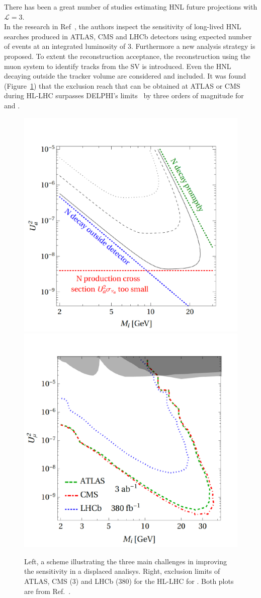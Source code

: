 There has been a great number of studies estimating HNL future
projections with $\mathcal{L} = 3$\abinv.\\
In the research in Ref~\cite{Drewes_2020_jan}, the authors inspect the
sensitivity of long-lived HNL searches produced in ATLAS, CMS and LHCb
detectors using expected number of events at an integrated luminosity
of 3\abinv. Furthermore a new analysis strategy is proposed. To extent
the reconstruction acceptance, the reconstruction using the muon system to identify tracks from the
SV is introduced. Even the HNL decaying outside the tracker
volume are considered and included. It was found
(Figure~\ref{fig:marco_sketch_ll}) that the exclusion
reach that can be obtained at ATLAS or CMS during HL-LHC surpasses
DELPHI's limits~\cite{Abreu:1996pa} by three orders of magnitude for
\mixparm and \mixpare.\\

\begin{figure}[h!]
\centering
    \includegraphics[clip,trim=0.cm 0cm 0cm 2cm, width=.38\textwidth]{Figures/c7/marco_god.pdf}
    \includegraphics[clip,trim=0.cm 0cm 0cm 2cm, width=.37\textwidth]{Figures/c7/marco_mu_HL.pdf}
\caption{Left, a scheme illustrating the three main challenges in
  improving the sensitivity in a displaced analisys. Right, exclusion
  limits of ATLAS, CMS (3\abinv) and LHCb (380\fbinv)
 for the HL-LHC for \mixparm. Both plots are
  from Ref.~\cite{Drewes_2020_jan}. }
\label{fig:marco_sketch_ll}
\end{figure}





